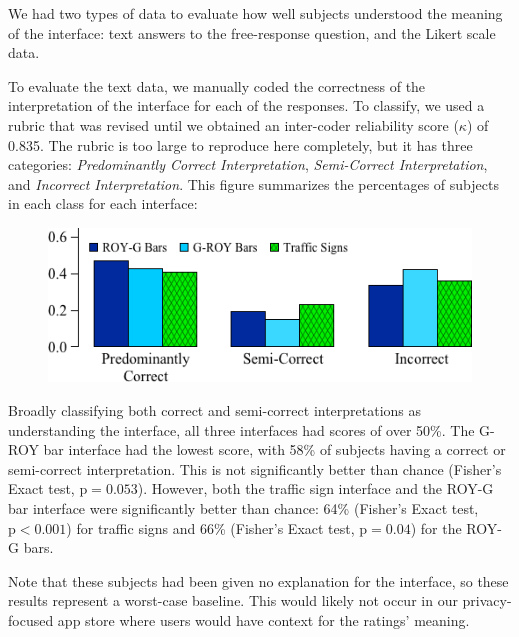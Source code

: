 \documentclass[11pt]{article}
\begin{document}
We had two types of data to evaluate how well subjects understood
the meaning of the interface: text answers to the free-response 
question, and the Likert scale data.

To evaluate the text data, we manually coded  the correctness
of the interpretation of the interface for each of 
the responses.
To classify, we used a rubric that was revised until we obtained an
inter-coder reliability score ($\kappa$) of 0.835. 
The rubric is too large to reproduce here completely, but it has three
categories: \emph{Predominantly Correct Interpretation},
\emph{Semi-Correct Interpretation}, and \emph{Incorrect Interpretation}.
This figure summarizes the percentages of subjects in
each class for each interface:

\begin{figure}[h]
\centering
    \includegraphics[width=.5\linewidth]{graphs/InterpPercentages.png}
    \label{text-cat}
\end{figure}
Broadly classifying both correct and semi-correct
interpretations as understanding the interface,
all three interfaces had scores of over 50\%. 
The G-ROY bar interface had the lowest 
score, with 58\% of 
subjects having a correct or semi-correct interpretation. This is not significantly better 
than chance (Fisher's Exact test, $\mathrm{p}=0.053$). However, both the traffic 
sign interface and the ROY-G bar interface were 
significantly better than chance:
64\% (Fisher's Exact test, $\mathrm{p}<0.001$) for traffic signs and
66\% (Fisher's Exact test, $\mathrm{p}=0.04$) for the ROY-G bars. 

Note that these subjects had been given no explanation for the
interface, so these results represent a worst-case baseline. 
This would likely not occur in
our privacy-focused app store where users would have 
context for the ratings' meaning.
\end{document}
